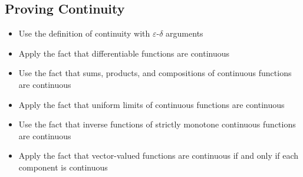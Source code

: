 \subsection*{Proving Continuity}
\begin{itemize}
\item Use the definition of continuity with $\varepsilon$-$\delta$ arguments
\item Apply the fact that differentiable functions are continuous
\item Use the fact that sums, products, and compositions of continuous functions are continuous
\item Apply the fact that uniform limits of continuous functions are continuous
\item Use the fact that inverse functions of strictly monotone continuous functions are continuous
\item Apply the fact that vector-valued functions are continuous if and only if each component is continuous
\end{itemize}

